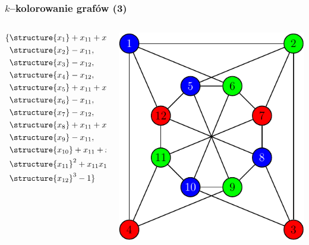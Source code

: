 \documentclass[10pt]{beamer}
\begin{document}
\begin{frame}
    \frametitle{$k$--kolorowanie grafów (3)}

    \begin{columns}
        \begin{column}[l]{0.4\textwidth}
            \begin{align*}
                \{& \structure{x_{1}} + x_{11} + x_{12},              \\
                  & \structure{x_{2}} - x_{11},                       \\
                  & \structure{x_{3}} - x_{12},                       \\
                  & \structure{x_{4}} - x_{12},                       \\
                  & \structure{x_{5}} + x_{11} + x_{12},              \\
                  & \structure{x_{6}} - x_{11},                       \\
                  & \structure{x_{7}} - x_{12},                       \\
                  & \structure{x_{8}} + x_{11} + x_{12},              \\
                  & \structure{x_{9}} - x_{11},                       \\
                  & \structure{x_{10}} + x_{11} + x_{12},             \\
                  & \structure{x_{11}}^2 + x_{11} x_{12} + x_{12}^2,  \\
                  & \structure{x_{12}}^3 - 1 \}
            \end{align*}
        \end{column}
        \begin{column}[r]{0.4\textwidth}
            \begin{center}
                \includegraphics[scale=0.6]{images/graph-color.pdf}
            \end{center}
        \end{column}
    \end{columns}
\end{frame}
\end{document}
